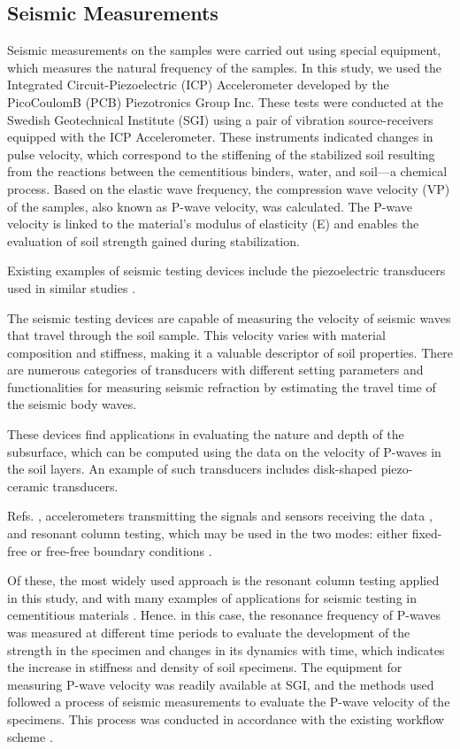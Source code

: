 \documentclass[sustainability,article,accept,pdftex,moreauthors]{Definitions/mdpi}
\begin{document}
{%
\subsection{Seismic Measurements}

Seismic measurements on the samples were carried out using special equipment, which measures the natural frequency of the samples. In this study, we used the Integrated Circuit-Piezoelectric (ICP) Accelerometer {developed }by the PicoCoulomB (PCB) Piezotronics Group Inc. These tests were conducted at the Swedish Geotechnical Institute (SGI) using a pair of vibration source-receivers equipped with the ICP Accelerometer. These instruments indicated changes in pulse velocity, which correspond to the stiffening of the stabilized soil resulting from the reactions between the cementitious binders, water, and soil—a chemical process. Based on the elastic wave frequency, the compression wave velocity (VP) of the samples, also known as P-wave velocity, was calculated. The P-wave velocity is linked to the material's modulus of elasticity (E) %
 and enables the evaluation of soil strength gained during stabilization. 

{Existing examples of seismic testing devices include the piezoelectric transducers used in similar studies} \cite{DUTTA20201269,Astuto,Brignoli}. {
The seismic testing devices are capable of measuring the velocity of seismic waves that travel through the soil sample. This velocity varies with material composition and stiffness, making it a valuable descriptor of soil properties. There are numerous categories of transducers with different setting parameters and functionalities for measuring seismic refraction by estimating the travel time of the seismic body waves.

These devices find applications in evaluating the nature and depth of the subsurface, which can be computed using the data on the velocity of P-waves in the soil layers. An example of such transducers includes disk-shaped piezo-ceramic transducers.}  Refs. \cite{SUWAL2013510,Irfan}, {accelerometers transmitting the signals and sensors receiving the data} \cite{SHABANI2023116589,2002121}, {and resonant column testing, which may be used in the two modes: either fixed-free or free-free boundary conditions} \cite{Drnevich}. 

{Of these, the most widely used approach is the resonant column testing applied in this study, and with many examples of applications for seismic testing in cementitious materials} \cite{LI2023108081,UMUTUMU2023101415,LIU2020104620,KANELLOPOULOS2022107366}. {Hence. in} this case, the resonance frequency of P-waves was measured at different time periods to evaluate the development of the strength in the specimen and changes in its dynamics with time, which indicates the increase in stiffness and density of soil specimens. 
The equipment for measuring P-wave velocity was readily available at SGI, and the methods used followed a process of seismic measurements to evaluate the P-wave velocity of the specimens. This process was conducted in accordance with the existing workflow scheme \cite{Lindh202224}. 

}
\end{document}

